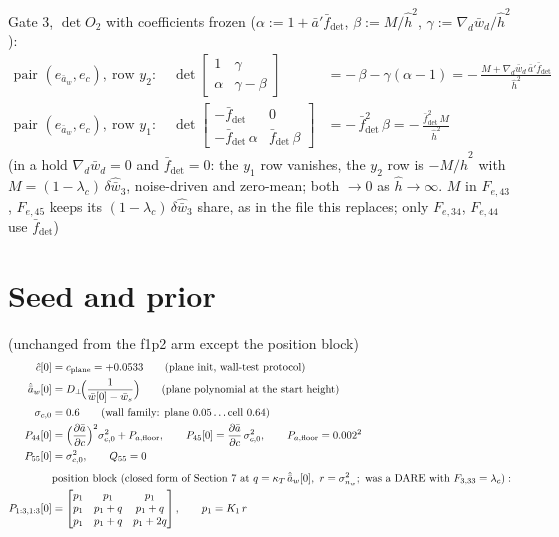 \documentclass[11pt,a4paper,fontset=none]{ctexart}
\newcommand{\ba}{\bar{a}}
\newcommand{\bw}{\bar{w}}
\newcommand{\ap}{\ba'}
\newcommand{\ah}{\hat{\ba}_w}
\newcommand{\hh}{\hat{h}}
\newcommand{\ch}{\hat{c}}
\newcommand{\lc}{\lambda_c}
\newcommand{\fdet}{\bar{f}_{\det}}
\begin{document}
Gate 3, $\det O_2$ with coefficients frozen ($\alpha := 1 + \ap\fdet$, $\beta := M/\hh^{2}$, $\gamma := \nabla_d\bw_d/\hh^{2}$):
\begin{align*}
\text{pair } (e_{\ba_w}, e_c),\ \text{row } y_2:\quad
\det\begin{bmatrix} 1 & \gamma \\ \alpha & \gamma - \beta \end{bmatrix} &= -\,\beta - \gamma(\alpha - 1) = -\,\frac{M + \nabla_d\bw_d\,\ap\fdet}{\hh^{2}} \\
\text{pair } (e_{\ba_w}, e_c),\ \text{row } y_1:\quad
\det\begin{bmatrix} -\fdet & 0 \\ -\fdet\,\alpha & \fdet\,\beta \end{bmatrix} &= -\,\fdet^{2}\,\beta = -\,\frac{\fdet^{2}\,M}{\hh^{2}}
\end{align*}
(in a hold $\nabla_d\bw_d = 0$ and $\fdet = 0$: the $y_1$ row vanishes, the $y_2$ row is $-M/\hh^{2}$ with $M = (1-\lc)\,\delta\hat{\bw}_3$,
noise-driven and zero-mean; both $\to 0$ as $\hh \to \infty$. $M$ in $F_{e,43}$, $F_{e,45}$ keeps its $(1-\lc)\,\delta\hat{\bw}_3$ share,
as in the file this replaces; only $F_{e,34}$, $F_{e,44}$ use $\fdet$)

\section*{Seed and prior}

(unchanged from the f1p2 arm except the position block)
\begin{align*}
\ch[0]  &= c_{\mathrm{plane}} = +0.0533 \qquad(\text{plane init, wall-test protocol}) \\
\ah[0]  &= D_{\perp}\!\Bigl(\frac{1}{\bw[0] - \bw_s}\Bigr) \qquad(\text{plane polynomial at the start height}) \\
\sigma_{c,0} &= 0.6 \qquad(\text{wall family: plane } 0.05 \dots \text{cell } 0.64) \\
P_{44}[0] &= \Bigl(\frac{\partial\ba}{\partial c}\Bigr)^{2}\sigma_{c,0}^{2} + P_{a,\mathrm{floor}}, \qquad P_{45}[0] = \frac{\partial\ba}{\partial c}\,\sigma_{c,0}^{2}, \qquad P_{a,\mathrm{floor}} = 0.002^{2} \\
P_{55}[0] &= \sigma_{c,0}^{2}, \qquad Q_{55} = 0 \\[4pt]
&\text{position block (closed form of Section 7 at } q = \kappa_T\,\ah[0],\ r = \sigma^{2}_{n_w};\ \text{was a DARE with } F_{3,33} = \lc): \\
P_{1:3,1:3}[0] &= \begin{bmatrix} p_1 & p_1 & p_1 \\ p_1 & p_1+q & p_1+q \\ p_1 & p_1+q & p_1+2q \end{bmatrix}, \qquad p_1 = K_1\,r
\end{align*}
\end{document}
